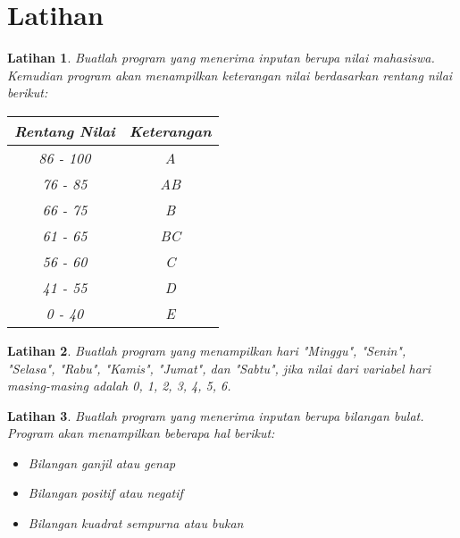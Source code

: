 \documentclass[aspectratio=169]{beamer}
\newtheorem{latihan}{Latihan}
\theoremstyle{definition}
\begin{document}
    \section{Latihan}
    \begin{frame}
        \begin{latihan}
            Buatlah program yang menerima inputan berupa nilai mahasiswa. Kemudian program akan menampilkan keterangan nilai berdasarkan rentang nilai berikut:
            \begin{table}
                \centering
                \begin{tabular}{|c|c|}
                    \hline
                    Rentang Nilai & Keterangan \\
                    \hline
                    86 - 100 & A \\
                    76 - 85 & AB \\
                    66 - 75 & B \\
                    61 - 65 & BC \\
                    56 - 60 & C \\
                    41 - 55 & D \\
                    0 - 40 & E \\
                    \hline
                \end{tabular}
            \end{table} 
        \end{latihan}
    \end{frame}

    \begin{frame}
        \begin{latihan}
            Buatlah program yang menampilkan hari "Minggu", "Senin", "Selasa", "Rabu", "Kamis", "Jumat", dan "Sabtu", jika nilai dari variabel hari masing-masing adalah 0, 1, 2, 3, 4, 5, 6.
        \end{latihan}
        \begin{latihan}
            Buatlah program yang menerima inputan berupa bilangan bulat. Program akan menampilkan beberapa hal berikut:
            \begin{itemize}[label=$\bullet$]
                \item Bilangan ganjil atau genap
                \item Bilangan positif atau negatif
                \item Bilangan kuadrat sempurna atau bukan 
            \end{itemize}
        \end{latihan}
    \end{frame}
\end{document}
